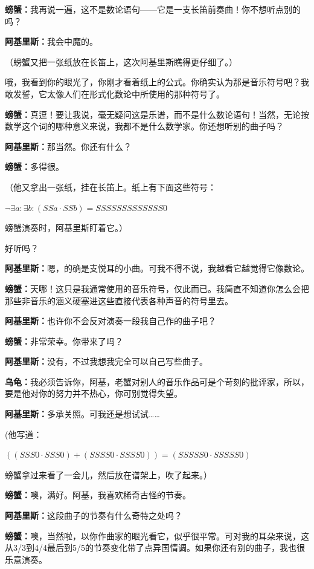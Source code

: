 \documentclass[
  12pt,
  twoside,
  openright,
  oldfontcommands,
]{memoir}
\newcommand{\kaitismall}[1]{{\kaitifamily\small #1}}
\newcommand{\dialogname}[1]{{\heifamily\bfseries #1}}
\begin{document}
\dialogname{螃蟹：}我再说一遍，这不是数论语句------它是一支长笛前奏曲！你不想听点别的吗？

\dialogname{阿基里斯：}我会中魔的。

（螃蟹又把一张纸放在长笛上，这次阿基里斯瞧得更仔细了。）

哦，我看到你的眼光了，你刚才看着纸上的公式。你确实认为那是音乐符号吧？我敢发誓，它太像人们在形式化数论中所使用的那种符号了。

\dialogname{螃蟹：}真逗！要让我说，毫无疑问这是乐谱，而不是什么数论语句！当然，无论按数学这个词的哪种意义来说，我都不是什么数学家。你还想听别的曲子吗？

\dialogname{阿基里斯：}那当然。你还有什么？

\dialogname{螃蟹：}多得很。

\kaitismall{（他又拿出一张纸，挂在长笛上。纸上有下面这些符号}：

$\lnot \exists a:\exists b:(SSa\cdot SSb)=SSSSSSSSSSSSS0$

螃蟹演奏时，阿基里斯盯着它。）

好听吗？

\dialogname{阿基里斯：}嗯，的确是支悦耳的小曲。可我不得不说，我越看它越觉得它像数论。

\dialogname{螃蟹：}天哪！这只是我通常使用的音乐符号，仅此而已。我简直不知道你怎么会把那些非音乐的涵义硬塞进这些直接代表各种声音的符号里去。

\dialogname{阿基里斯：}也许你不会反对演奏一段我自己作的曲子吧？

\dialogname{螃蟹：}非常荣幸。你带来了吗？

\dialogname{阿基里斯：}没有，不过我想我完全可以自己写些曲子。

\dialogname{乌龟：}我必须告诉你，阿基，老蟹对别人的音乐作品可是个苛刻的批评家，所以，要是他对你的努力并不热心，你可别觉得失望。

\dialogname{阿基里斯：}多承关照。可我还是想试试\ldots\ldots{}

\kaitismall{(他写道：}

$((SSS0\cdot SSS0)+(SSSS0\cdot SSSS0))=(SSSSS0\cdot SSSSS0)$

螃蟹拿过来看了一会儿，然后放在谱架上，吹了起来。）

\dialogname{螃蟹：}噢，满好。阿基，我喜欢稀奇古怪的节奏。

\dialogname{阿基里斯：}这段曲子的节奏有什么奇特之处吗？

\dialogname{螃蟹：}噢，当然啦，以你作曲家的眼光看它，似乎很平常。可对我的耳朵来说，这从3/3到4/4最后到5/5的节奏变化带了点异国情调。如果你还有别的曲子，我也很乐意演奏。
\end{document}
